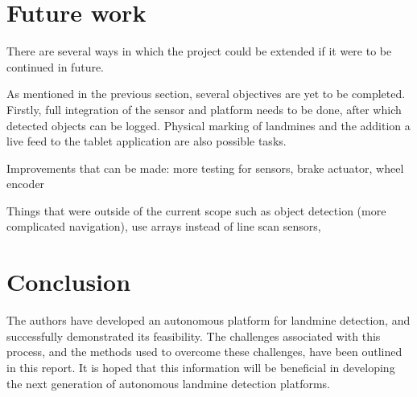 \documentclass[main.tex]{subfiles}
\begin{document}
\section{Future work}
There are several ways in which the project could be extended if it were to be continued in future. 

As mentioned in the previous section, several objectives are yet to be completed. Firstly, full integration of the sensor and platform needs to be done, after which detected objects can be logged. Physical marking of landmines and the addition a live feed to the tablet application are also possible tasks.

Improvements that can be made: more testing for sensors, brake actuator, wheel encoder

Things that were outside of the current scope such as object detection (more complicated navigation), use arrays instead of line scan sensors, 

\section{Conclusion}
The authors have developed an autonomous platform for landmine detection, and successfully demonstrated its feasibility. The challenges associated with this process, and the methods used to overcome these challenges, have been outlined in this report. It is hoped that this information will be beneficial in developing the next generation of autonomous landmine detection platforms.  
\end{document}
